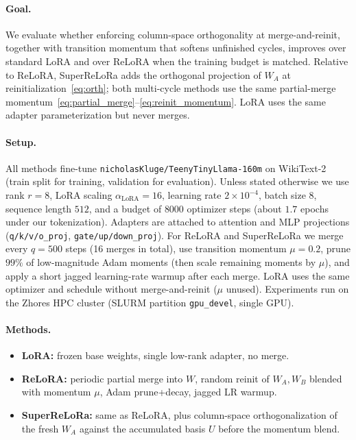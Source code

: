 \paragraph{Goal.}
We evaluate whether enforcing column-space orthogonality at merge-and-reinit, together with transition momentum that softens unfinished cycles, improves over standard LoRA and over ReLoRA when the training budget is matched.
Relative to ReLoRA, SuperReLoRa adds the orthogonal projection of $W_A$ at reinitialization~\eqref{eq:orth}; both multi-cycle methods use the same partial-merge momentum~\eqref{eq:partial_merge}--\eqref{eq:reinit_momentum}.
LoRA uses the same adapter parameterization but never merges.

\paragraph{Setup.}
All methods fine-tune \texttt{nicholasKluge/TeenyTinyLlama-160m} on WikiText-2~\cite{merity2016pointer} (train split for training, validation for evaluation).
Unless stated otherwise we use rank $r{=}8$, LoRA scaling $\alpha_{\mathrm{LoRA}}{=}16$, learning rate $2{\times}10^{-4}$, batch size $8$, sequence length $512$, and a budget of $8000$ optimizer steps (about $1.7$ epochs under our tokenization).
Adapters are attached to attention and MLP projections
(\texttt{q/k/v/o\_proj}, \texttt{gate/up/down\_proj}).
For ReLoRA and SuperReLoRa we merge every $q{=}500$ steps (16 merges in total), use transition momentum $\mu{=}0.2$, prune $99\%$ of low-magnitude Adam moments (then scale remaining moments by $\mu$), and apply a short jagged learning-rate warmup after each merge.
LoRA uses the same optimizer and schedule without merge-and-reinit ($\mu$ unused).
Experiments run on the Zhores HPC cluster (SLURM partition \texttt{gpu\_devel}, single GPU).

\paragraph{Methods.}
\begin{itemize}
    \item \textbf{LoRA:} frozen base weights, single low-rank adapter, no merge.
    \item \textbf{ReLoRA:} periodic partial merge into $W$, random reinit of $W_A,W_B$ blended with momentum $\mu$, Adam prune+decay, jagged LR warmup.
    \item \textbf{SuperReLoRa:} same as ReLoRA, plus column-space orthogonalization of the fresh $W_A$ against the accumulated basis $U$ before the momentum blend.
\end{itemize}

